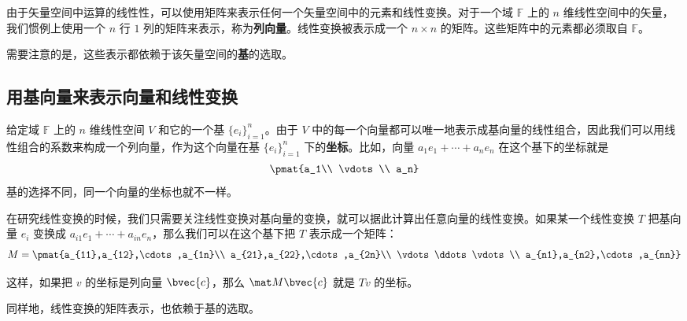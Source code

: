 
\begin{issues}
\end{issues}


由于矢量空间中运算的线性性，可以使用矩阵来表示任何一个矢量空间中的元素和线性变换。对于一个域 $\mathbb{F}$ 上的 $n$ 维线性空间中的矢量，我们惯例上使用一个 $n$ 行 $1$ 列的矩阵来表示，称为\textbf{列向量}。线性变换被表示成一个 $n\times n$ 的矩阵。这些矩阵中的元素都必须取自 $\mathbb{F}$。

需要注意的是，这些表示都依赖于该矢量空间的\textbf{基}的选取。


\subsection{用基向量来表示向量和线性变换}

给定域 $\mathbb{F}$ 上的 $n$ 维线性空间 $V$ 和它的一个基 $\{{e}_i\}_{i=1}^{n}$。由于 $V$ 中的每一个向量都可以唯一地表示成基向量的线性组合，因此我们可以用线性组合的系数来构成一个列向量，作为这个向量在基 $\{{e}_i\}_{i=1}^{n}$ 下的\textbf{坐标}。比如，向量 $a_1 {e}_1+\cdots+a_n {e}_n$ 在这个基下的坐标就是
\begin{equation}
\pmat{a_1\\ \vdots\\ a_n}
\end{equation}
基的选择不同，同一个向量的坐标也就不一样。

在研究线性变换的时候，我们只需要关注线性变换对基向量的变换，就可以据此计算出任意向量的线性变换。如果某一个线性变换 $T$ 把基向量 ${e}_i$ 变换成 $a_{i1} {e}_1+\cdots+a_{in} {e}_n$，那么我们可以在这个基下把 $T$ 表示成一个矩阵：
\begin{equation}
M=\pmat{a_{11},a_{12},\cdots,a_{1n}\\ a_{21},a_{22},\cdots,a_{2n}\\ \vdots\ddots\vdots\\ a_{n1},a_{n2},\cdots,a_{nn}}
\end{equation}

这样，如果把 ${v}$ 的坐标是列向量 $\bvec {c}$，那么 $\mat M\bvec{c}$ 就是 $T{v}$ 的坐标。

同样地，线性变换的矩阵表示，也依赖于基的选取。
